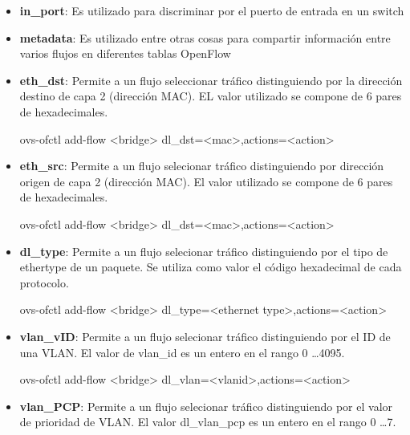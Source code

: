\begin{itemize}

\item \textbf{in\_port}: Es utilizado para discriminar por el puerto de entrada en un switch

\item \textbf{metadata}: Es utilizado entre otras cosas para compartir informaci\'on entre varios flujos en diferentes tablas OpenFlow

\item \textbf{eth\_dst}: Permite a un flujo seleccionar tr\'afico distinguiendo por la direcci\'on destino de capa 2 (dirección MAC). EL valor utilizado se compone de 6 pares de hexadecimales.

\begin{center}
ovs-ofctl add-flow <bridge> dl\_dst=<mac>,actions=<action>
\end{center}

\item \textbf{eth\_src}: Permite a un flujo selecionar tr\'afico distinguiendo por direcci\'on origen de capa 2 (direcci\'on MAC). El valor utilizado se compone de 6 pares de hexadecimales.

\begin{center}
ovs-ofctl add-flow <bridge> dl\_dst=<mac>,actions=<action>
\end{center}

\item \textbf{dl\_type}: Permite a un flujo selecionar tr\'afico distinguiendo por el tipo de ethertype de un paquete. Se utiliza como valor el c\'odigo hexadecimal de cada protocolo.

\begin{center}
ovs-ofctl add-flow <bridge> dl\_type=<ethernet type>,actions=<action>
\end{center}

\item \textbf{vlan\_vID}: Permite a un flujo selecionar tr\'afico distinguiendo por el ID de una VLAN. El valor de vlan\_id es un entero en el rango 0 \dots 4095.

\begin{center}
ovs-ofctl add-flow <bridge> dl\_vlan=<vlanid>,actions=<action>
\end{center}

\item \textbf{vlan\_PCP}: Permite a un flujo selecionar tr\'afico distinguiendo por el valor de prioridad de VLAN. El valor dl\_vlan\_pcp es un entero en el rango 0 \dots 7.


\end{itemize}
